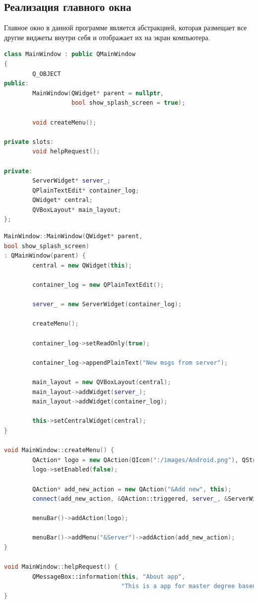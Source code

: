 \documentclass[a4paper, 14pt]{extreport}
\begin{document}
\subsection{Реализация главного окна}
\par Главное окно в данной программе является абстракцией, которая размещает все другие виджеты внутри себя и отображает их на экран
компьютера.
\begin{lstlisting}[language=C++, frame=single, xleftmargin=15pt, caption={Заголовочный файл класса MainWidget},label=DescriptiveLabel]
class MainWindow : public QMainWindow
{
        Q_OBJECT
public:
        MainWindow(QWidget* parent = nullptr, 
                   bool show_splash_screen = true);

        void createMenu();

private slots:
        void helpRequest();

private:
        ServerWidget* server_;
        QPlainTextEdit* container_log;
        QWidget* central;
        QVBoxLayout* main_layout;
};
\end{lstlisting}
\begin{lstlisting}[language=C++, frame=single, xleftmargin=15pt, caption={Определение методов класса MainWidget},label=DescriptiveLabel]
MainWindow::MainWindow(QWidget* parent,
bool show_splash_screen)
: QMainWindow(parent) {
        central = new QWidget(this);

        container_log = new QPlainTextEdit();

        server_ = new ServerWidget(container_log);

        createMenu();

        container_log->setReadOnly(true);

        container_log->appendPlainText("New msgs from server");

        main_layout = new QVBoxLayout(central);
        main_layout->addWidget(server_);
        main_layout->addWidget(container_log);

        this->setCentralWidget(central);
}

void MainWindow::createMenu() {
        QAction* logo = new QAction(QIcon(":/images/Android.png"), QString(), this);
        logo->setEnabled(false);

        QAction* add_new_action = new QAction("&Add new", this);
        connect(add_new_action, &QAction::triggered, server_, &ServerWidget::createServer);

        menuBar()->addAction(logo);

        menuBar()->addMenu("&Server")->addAction(add_new_action);
}

void MainWindow::helpRequest() {
        QMessageBox::information(this, "About app", 
                                 "This is a app for master degree based on Qt5.");
}
\end{lstlisting}
\end{document}
